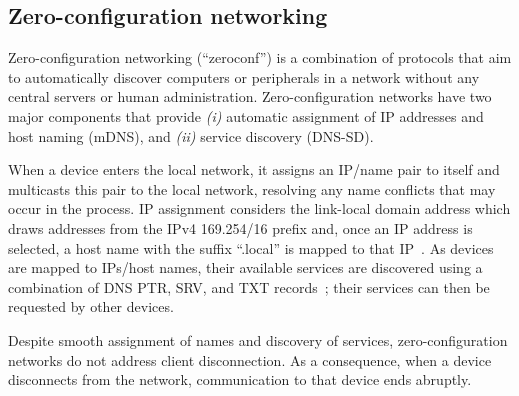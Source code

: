 \subsection{Zero-configuration networking}
\label{sec:zeroconf}

Zero-configuration networking (``zeroconf'') is a combination of protocols that aim to automatically discover computers or peripherals in a network without any central servers or human administration. Zero-configuration networks have two major components that provide {\it (i)} automatic assignment of IP addresses and host naming (mDNS), and {\it (ii)} service discovery (DNS-SD).

When a device enters the local network, it assigns an IP/name pair to itself and  multicasts this pair to the local network, resolving any name conflicts that may occur in the process. IP assignment considers the link-local domain address which draws addresses from the IPv4 169.254/16 prefix and, once an IP address is selected, a host name with the suffix ``.local'' is mapped to that IP~\cite{rfc6762}. As devices are mapped to IPs/host names, their available services are discovered using a combination of DNS PTR, SRV, and TXT records~\cite{rfc6763}; their services can then be requested by other devices.

Despite smooth assignment of names and discovery of services, zero-configuration networks do not address client disconnection. As a consequence, when a device disconnects from the network, communication to that device ends abruptly.
